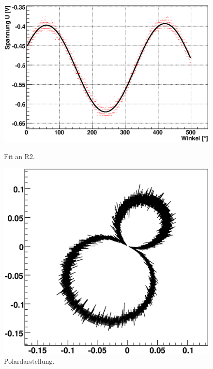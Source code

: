 \documentclass[12pt]{article}
\begin{document}
\begin{figure}[H]  
\begin{minipage}{0.49\linewidth}
\centering
\includegraphics[width=0.9\linewidth]{pictures/R2.eps}
\caption{Fit an R2.}
\end{minipage}
\begin{minipage}{0.5\linewidth}
\centering 
\includegraphics[width=0.9\linewidth]{pictures/R2vd.eps}
\caption{Polardarstellung.}
\end{minipage}
\end{figure}
\end{document}
